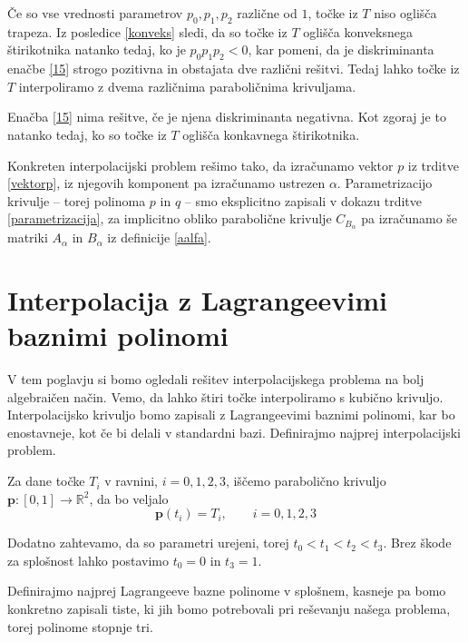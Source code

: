 \documentclass[mat1]{fmfdelo}
\newcommand{\R}{\mathbb R}
\newcommand{\al}{\alpha}
\begin{document}
\begin{dokaz}
Če so vse vrednosti parametrov $p_0, p_1, p_2$ različne od $1$, točke iz $T$ niso oglišča trapeza. Iz posledice \ref{konveks} sledi, da so točke iz $T$ oglišča konveksnega štirikotnika natanko tedaj, ko je $p_0 p_1 p_2 < 0$, kar pomeni, da je diskriminanta enačbe \eqref{15} strogo pozitivna in obstajata dve različni rešitvi. Tedaj lahko točke iz $T$ interpoliramo z dvema različnima paraboličnima krivuljama. 

Enačba \eqref{15} nima rešitve, če je njena diskriminanta negativna. Kot zgoraj je to natanko tedaj, ko so točke iz $T$ oglišča konkavnega štirikotnika.
\end{dokaz}

Konkreten interpolacijski problem rešimo tako, da izračunamo vektor $p$ iz trditve \ref{vektorp}, iz njegovih komponent pa izračunamo ustrezen $\al$. Parametrizacijo krivulje -- torej polinoma $p$ in $q$ -- smo eksplicitno zapisali v dokazu trditve \ref{parametrizacija}, za implicitno obliko parabolične krivulje $C_{B_\al}$ pa izračunamo še matriki $A_\al$ in $B_\al$ iz definicije \ref{aalfa}.



\section{Interpolacija z Lagrangeevimi baznimi polinomi}

V tem poglavju si bomo ogledali rešitev interpolacijskega problema na bolj algebraičen način. Vemo, da lahko štiri točke interpoliramo s kubično krivuljo. Interpolacijsko krivuljo bomo zapisali z Lagrangeevimi baznimi polinomi, kar bo enostavneje, kot če bi delali v standardni bazi. Definirajmo najprej interpolacijski problem.

Za dane točke $T_i$ v ravnini, $i = 0, 1, 2, 3$, iščemo parabolično krivuljo $\textbf{p} : [ 0, 1 ] \rightarrow \R^2$, da bo veljalo $$\textbf{p}(t_i) = T_i, \qquad i = 0, 1, 2, 3$$ 

Dodatno zahtevamo, da so parametri urejeni, torej $t_0 < t_1 < t_2 < t_3$. Brez škode za splošnost lahko postavimo $t_0 = 0$ in $t_3 = 1$.

Definirajmo najprej Lagrangeeve bazne polinome v splošnem, kasneje pa bomo konkretno zapisali tiste, ki jih bomo potrebovali pri reševanju našega problema, torej polinome stopnje tri.
\end{document}
